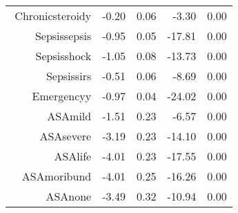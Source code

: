 \begin{tabular}{rrrrr}
$$  Chronic\-steroid\-y & -0.20 & 0.06 & -3.30 & 0.00 \\ 
  Sepsis\-sepsis & -0.95 & 0.05 & -17.81 & 0.00 \\ 
  Sepsis\-shock & -1.05 & 0.08 & -13.73 & 0.00 \\ 
  Sepsis\-sirs & -0.51 & 0.06 & -8.69 & 0.00 \\ 
  Emergency\-y & -0.97 & 0.04 & -24.02 & 0.00 \\ 
  ASA\-mild & -1.51 & 0.23 & -6.57 & 0.00 \\ 
  ASA\-severe & -3.19 & 0.23 & -14.10 & 0.00 \\ 
  ASA\-life & -4.01 & 0.23 & -17.55 & 0.00 \\ 
  ASA\-moribund & -4.01 & 0.25 & -16.26 & 0.00 \\ 
  ASA\-none & -3.49 & 0.32 & -10.94 & 0.00 \\ 
   \hline
\end{tabular}

